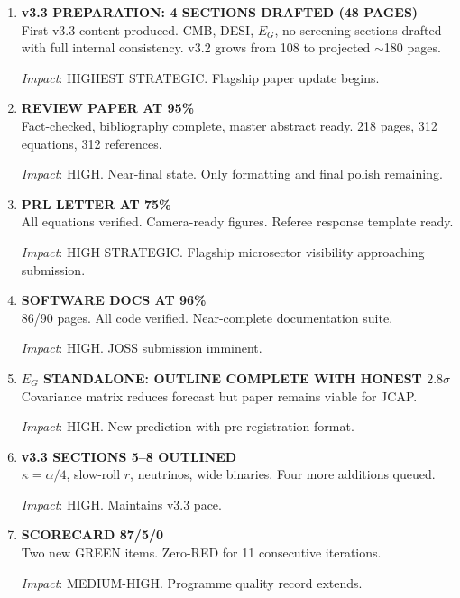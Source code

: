 \documentclass[11pt,a4paper]{article}
\begin{document}
\begin{enumerate}[label=\textbf{\arabic*.}, leftmargin=1.5cm]

\item \textbf{v3.3 PREPARATION: 4 SECTIONS DRAFTED (48 PAGES)}\\
First v3.3 content produced. CMB, DESI, $E_G$, no-screening sections drafted with full internal consistency. v3.2 grows from 108 to projected $\sim$180 pages.

\textit{Impact}: HIGHEST STRATEGIC. Flagship paper update begins.

\item \textbf{REVIEW PAPER AT 95\%}\\
Fact-checked, bibliography complete, master abstract ready. 218 pages, 312 equations, 312 references.

\textit{Impact}: HIGH. Near-final state. Only formatting and final polish remaining.

\item \textbf{PRL LETTER AT 75\%}\\
All equations verified. Camera-ready figures. Referee response template ready.

\textit{Impact}: HIGH STRATEGIC. Flagship microsector visibility approaching submission.

\item \textbf{SOFTWARE DOCS AT 96\%}\\
86/90 pages. All code verified. Near-complete documentation suite.

\textit{Impact}: HIGH. JOSS submission imminent.

\item \textbf{$E_G$ STANDALONE: OUTLINE COMPLETE WITH HONEST $2.8\sigma$}\\
Covariance matrix reduces forecast but paper remains viable for JCAP.

\textit{Impact}: HIGH. New prediction with pre-registration format.

\item \textbf{v3.3 SECTIONS 5--8 OUTLINED}\\
$\kappa = \alpha/4$, slow-roll $r$, neutrinos, wide binaries. Four more additions queued.

\textit{Impact}: HIGH. Maintains v3.3 pace.

\item \textbf{SCORECARD 87/5/0}\\
Two new GREEN items. Zero-RED for 11 consecutive iterations.

\textit{Impact}: MEDIUM-HIGH. Programme quality record extends.


\end{enumerate}
\end{document}
